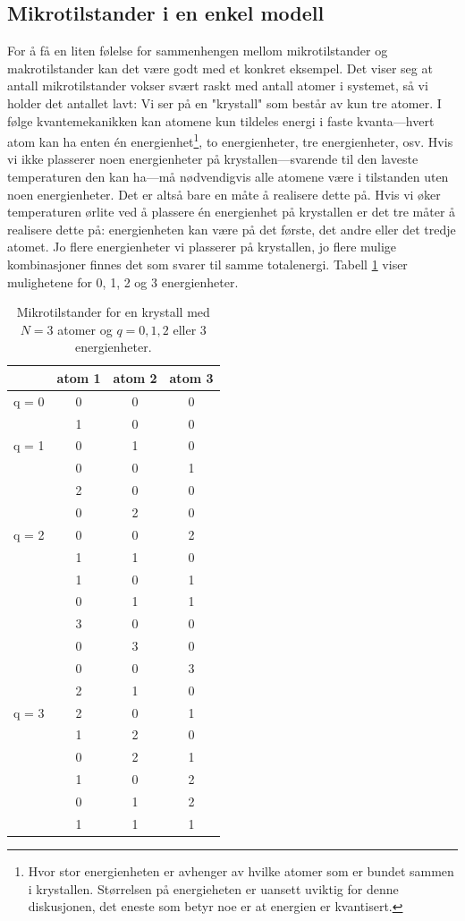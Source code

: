 \subsection{Mikrotilstander i en enkel modell}
\label{sec:t2:minikrystall}
For å få en liten følelse for sammenhengen mellom mikrotilstander og makrotilstander kan det være godt med et konkret eksempel. Det viser seg at antall mikrotilstander vokser svært raskt med antall atomer i systemet, så vi holder det antallet lavt: Vi ser på en "krystall" som består av kun tre atomer. I følge kvantemekanikken kan atomene kun tildeles energi i faste kvanta---hvert atom kan ha enten \'en energienhet\footnote{Hvor stor energienheten er avhenger av hvilke atomer som er bundet sammen i krystallen. Størrelsen på energieheten er uansett uviktig for denne diskusjonen, det eneste som betyr noe er at energien er kvantisert.}, to energienheter, tre energienheter, osv. Hvis vi ikke plasserer noen energienheter på krystallen---svarende til den laveste temperaturen den kan ha---må nødvendigvis alle atomene være i tilstanden uten noen energienheter. Det er altså bare en måte å realisere dette på. Hvis vi øker temperaturen ørlite ved å plassere \'en energienhet på krystallen er det tre måter å realisere dette på: energienheten kan være på det første, det andre eller det tredje atomet. Jo flere energienheter vi plasserer på krystallen, jo flere mulige kombinasjoner finnes det som svarer til samme totalenergi. Tabell \ref{tab:t2:multipl} viser mulighetene for 0, 1, 2 og 3 energienheter.

\begin{table}[htp]
\begin{center}
\begin{tabular}{c|ccc}
& atom 1 & atom 2 & atom 3 \\
\hline
\hline
q = 0 & 0 & 0 & 0 \\
\hline
& 1 & 0 & 0 \\
q = 1 & 0 & 1 & 0 \\
& 0 & 0 & 1 \\
\hline
& 2 & 0 & 0 \\
& 0 & 2 & 0 \\
q = 2 & 0 & 0 & 2 \\
& 1 & 1 & 0 \\
& 1 & 0 & 1 \\
& 0 & 1 & 1  \\
\hline
& 3 & 0 & 0 \\
& 0 & 3 & 0 \\
& 0 & 0 & 3 \\
& 2 & 1 & 0 \\
q = 3 & 2 & 0 & 1 \\
& 1 & 2 & 0 \\
& 0 & 2 & 1  \\
& 1 & 0 & 2 \\
& 0 & 1 & 2 \\
& 1 & 1 & 1 \\
\hline
\hline
\end{tabular}
\end{center}
\caption{Mikrotilstander for en krystall med $N=3$ atomer og $q = 0, 1, 2$ eller 3 energienheter.}
\label{tab:t2:multipl}
\end{table}

